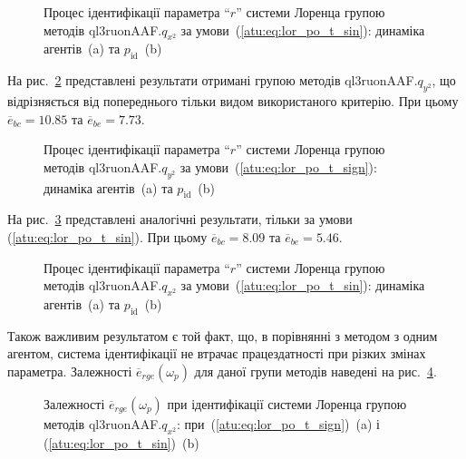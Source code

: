 \begin{figure}[htb!]
  \caption{Процес ідентифікації параметра ``$r$'' системи Лоренца групою методів ql3ruonAAF.$q_{x^2} $ за умови~(\ref{atu:eq:lor_po_t_sin}): динаміка агентів~(a) та $p_\mathrm{id}$~(b)}
\label{atu:f:lor_id_ql3ruonAAF.q_x2_sin}
\end{figure}


На рис.~\ref{atu:f:lor_id_ql3ruonAAF.q_y2_sign} представлені результати отримані
групою методів ql3ruonAAF.$q_{y^2}$, що відрізняється від попереднього тільки видом
використаного критерію. При цьому
$\overline{e}_{bc}=10.85$
та
$\overline{e}_{be}=7.73$.

\begin{figure}[htb!]
  \caption{Процес ідентифікації параметра ``$r$'' системи Лоренца групою методів ql3ruonAAF.$q_{y^2}$ за умови~(\ref{atu:eq:lor_po_t_sign}): динаміка агентів~(a) та $p_\mathrm{id}$~(b)}
  \label{atu:f:lor_id_ql3ruonAAF.q_y2_sign}
\end{figure}


На рис.~\ref{atu:f:lor_id_ql3ruonAAF.q_y2_sin} представлені аналогічні результати,
тільки за умови (\ref{atu:eq:lor_po_t_sin}). При цьому
$\overline{e}_{bc}=8.09$
та
$\overline{e}_{be}=5.46$.


\begin{figure}[htb!]
  \caption{Процес ідентифікації параметра ``$r$'' системи Лоренца групою методів ql3ruonAAF.$q_{x^2} $ за умови~(\ref{atu:eq:lor_po_t_sin}): динаміка агентів~(a) та $p_\mathrm{id}$~(b)}
  \label{atu:f:lor_id_ql3ruonAAF.q_y2_sin}
\end{figure}

Також важливим результатом є той факт, що, в порівнянні з
методом з одним агентом, система ідентифікації не втрачає
працездатності при різких змінах параметра. Залежності
$\overline{e}_{rge} (\omega_p) $ для даної групи методів наведені на
рис.~\ref{atu:f:lor_ql3ruonAAF_e_omega_p}.


\begin{figure}[htb!]
  \caption{Залежності $ \overline{e}_{rge} (\omega_p) $ при ідентифікації системи Лоренца групою методів ql3ruonAAF.$q_{x^2}$: при~(\ref{atu:eq:lor_po_t_sign})~(a) і (\ref{atu:eq:lor_po_t_sin})~(b)}
  \label{atu:f:lor_ql3ruonAAF_e_omega_p}
\end{figure}

